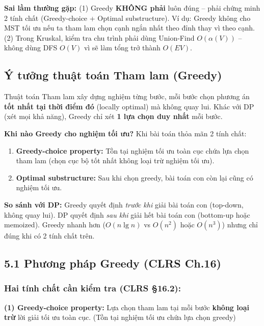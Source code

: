 \documentclass[10pt]{article}
\newcommand{\pitfall}[1]{%
  \begin{tcolorbox}[colback=red!5!white, colframe=red!60!white, leftrule=3pt,
    toprule=0pt, bottomrule=0pt, rightrule=0pt,
    boxsep=2pt, left=6pt, right=6pt, top=4pt, bottom=4pt]
  \small\textbf{\textcolor{red!70!black}{Sai lầm thường gặp: }}#1
  \end{tcolorbox}}
\begin{document}
\pitfall{(1) Greedy \textbf{KHÔNG phải} luôn đúng -- phải chứng minh 2 tính chất (Greedy-choice + Optimal substructure). Ví dụ: Greedy không cho MST tối ưu nếu ta tham lam chọn cạnh ngắn nhất theo đỉnh thay vì theo cạnh. (2) Trong Kruskal, kiểm tra chu trình phải dùng Union-Find $O(\alpha(V))$ -- không dùng DFS $O(V)$ vì sẽ làm tổng trở thành $O(EV)$.}


\subsection{Ý tưởng thuật toán Tham lam (Greedy)}\label{y-tuong-greedy}

Thuật toán Tham lam xây dựng nghiệm từng bước, mỗi bước chọn phương án \textbf{tốt nhất tại thời điểm đó} (locally optimal) mà không quay lui. Khác với DP (xét mọi khả năng), Greedy chỉ xét \textbf{1 lựa chọn duy nhất} mỗi bước.

\textbf{Khi nào Greedy cho nghiệm tối ưu?} Khi bài toán thỏa mãn 2 tính chất:
\begin{enumerate}
\item \textbf{Greedy-choice property:} Tồn tại nghiệm tối ưu toàn cục chứa lựa chọn tham lam (chọn cục bộ tốt nhất không loại trừ nghiệm tối ưu).
\item \textbf{Optimal substructure:} Sau khi chọn greedy, bài toán con còn lại cũng có nghiệm tối ưu.
\end{enumerate}

\textbf{So sánh với DP:} Greedy quyết định \textit{trước khi} giải bài toán con (top-down, không quay lui). DP quyết định \textit{sau khi} giải hết bài toán con (bottom-up hoặc memoized). Greedy nhanh hơn ($O(n \lg n)$ vs $O(n^2)$ hoặc $O(n^3)$) nhưng chỉ đúng khi có 2 tính chất trên.

\subsection{5.1 Phương pháp Greedy (CLRS Ch.16)}\label{phux1b0ux1a1ng-phuxe1p-greedy-clrs-ch.16}

\subsubsection{\texorpdfstring{Hai tính chất cần kiểm tra (CLRS
\S 16.2):}{Hai tính chất cần kiểm tra (CLRS 16.2):}}\label{hai-tuxednh-chux1ea5t-cux1ea7n-kiux1ec3m-tra-clrs-16.2}

\textbf{(1) Greedy-choice property:} Lựa chọn tham lam tại mỗi bước
\textbf{không loại trừ} lời giải tối ưu toàn cục. (Tồn tại nghiệm tối ưu
chứa lựa chọn greedy)
\end{document}
